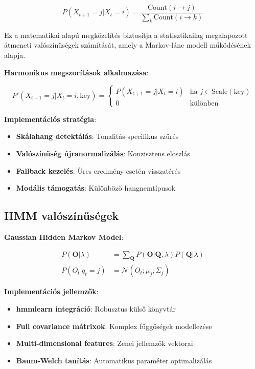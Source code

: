 \begin{equation}
P(X_{t+1} = j | X_t = i) = \frac{\text{Count}(i \rightarrow j)}{\sum_{k} \text{Count}(i \rightarrow k)}
\end{equation}

Ez a matematikai alapú megközelítés biztosítja a statisztikailag megalapozott átmeneti valószínűségek számítását, amely a Markov-lánc modell működésének alapja.

\textbf{Harmonikus megszorítások alkalmazása}:

\begin{equation}
P'(X_{t+1} = j | X_t = i, \text{key}) = \begin{cases}
P(X_{t+1} = j | X_t = i) & \text{ha } j \in \text{Scale}(\text{key}) \\
0 & \text{különben}
\end{cases}
\end{equation}

\textbf{Implementációs stratégia}:
\begin{itemize}
    \item \textbf{Skálahang detektálás}: Tonalitás-specifikus szűrés
    \item \textbf{Valószínűség újranormalizálás}: Konzisztens eloszlás
    \item \textbf{Fallback kezelés}: Üres eredmény esetén visszatérés
    \item \textbf{Modális támogatás}: Különböző hangnemtípusok
\end{itemize}

\subsection{HMM valószínűségek}

\textbf{Gaussian Hidden Markov Model}:

\begin{align}
P(\mathbf{O} | \lambda) &= \sum_{\mathbf{Q}} P(\mathbf{O} | \mathbf{Q}, \lambda) P(\mathbf{Q} | \lambda) \\
P(O_t | q_t = j) &= \mathcal{N}(O_t; \mu_j, \Sigma_j)
\end{align}

\textbf{Implementációs jellemzők}:
\begin{itemize}
    \item \textbf{hmmlearn integráció}: Robusztus külső könyvtár
    \item \textbf{Full covariance mátrixok}: Komplex függőségek modellezése  
    \item \textbf{Multi-dimensional features}: Zenei jellemzők vektorai
    \item \textbf{Baum-Welch tanítás}: Automatikus paraméter optimalizálás
\end{itemize}

